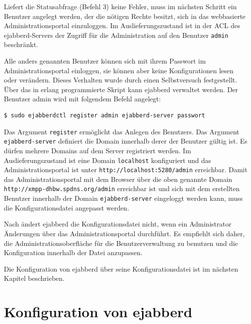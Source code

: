 \documentclass[a4paper,titlepage,halfparskip,12pt]{scrreprt}
\begin{document}
\begin{onehalfspacing}
Liefert die Statusabfrage (Befehl 3) keine Fehler, muss im nächsten Schritt ein Benutzer angelegt werden, der die nötigen Rechte besitzt, sich in das webbasierte Administrationsportal einzuloggen. Im Auslieferungszustand ist in der \ac{ACL} des ejabberd-Servers der Zugriff für die Administration auf den Benutzer \texttt{admin} beschränkt.\cite{ejabberdMGMT}

Alle anders genannten Benutzer können sich mit ihrem Passwort im Administrationsportal einloggen, sie können aber keine Konfigurationen lesen oder verändern. Dieses Verhalten wurde durch einen Selbstversuch festgestellt. Über das in erlang programmierte Skript kann ejabberd verwaltet werden. Der Benutzer admin wird mit folgendem Befehl angelegt:\cite{ejabberdMGMT}

\bigskip

\begin{lstlisting}[language=bash, caption={Anlegen eines Benutzers für die Verwaltung von ejabberd},label={lst:AddAdminUserEjabberd}]
$ sudo ejabberdctl register admin ejabberd-server passwort
\end{lstlisting}

Das Argument \texttt{register} ermöglicht das Anlegen des Benutzers. Das Argument \texttt{ejabberd-server} definiert die Domain innerhalb derer der Benutzer gültig ist. Es dürfen mehrere Domains auf dem Server registriert werden. Im Auslieferungszustand ist eine Domain \texttt{localhost} konfiguriert und das Administrationsportal ist unter \texttt{http://localhost:5280/admin} erreichbar. Damit das Administrationsportal mit dem Browser über die oben genannte Domain \texttt{http://xmpp-dhbw.spdns.org/admin} erreichbar ist und sich mit dem erstellten Benutzer innerhalb der Domain \texttt{ejabberd-server} eingeloggt werden kann, muss die Konfigurationsdatei angepasst werden.\cite{ejabberdMGMT}

Nach \cite{ejabberdDoc} ändert ejabberd die Konfigurationsdatei nicht, wenn ein Administrator Änderungen über das Administrationsportal durchführt. Es empfiehlt sich daher, die Administrationsoberfläche für die Benutzerverwaltung zu benutzen und die Konfiguration innerhalb der Datei anzupassen.

Die Konfiguration von ejabberd über seine Konfigurationsdatei ist im nächsten Kapitel beschrieben.


\section{Konfiguration von ejabberd}
\label{sec:Konfiguration}


\end{onehalfspacing}
\end{document}
